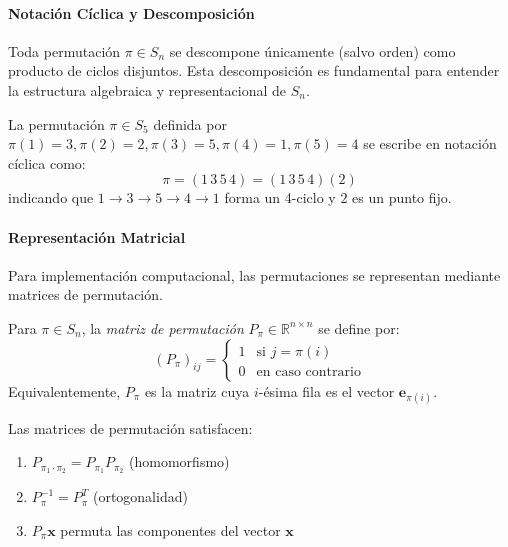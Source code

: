 \paragraph{Notación Cíclica y Descomposición}

Toda permutación $\pi \in S_n$ se descompone únicamente (salvo orden) como producto de ciclos disjuntos. Esta descomposición es fundamental para entender la estructura algebraica y representacional de $S_n$.

\begin{example}
La permutación $\pi \in S_5$ definida por $\pi(1)=3, \pi(2)=2, \pi(3)=5, \pi(4)=1, \pi(5)=4$ se escribe en notación cíclica como:
\begin{equation}
\pi = (1\,3\,5\,4) = (1\,3\,5\,4)(2)
\end{equation}
indicando que $1 \to 3 \to 5 \to 4 \to 1$ forma un 4-ciclo y $2$ es un punto fijo.
\end{example}

\paragraph{Representación Matricial}

Para implementación computacional, las permutaciones se representan mediante matrices de permutación.

\begin{definition}\label{def:permutation_matrix}
Para $\pi \in S_n$, la \textit{matriz de permutación} $P_\pi \in \mathbb{R}^{n \times n}$ se define por:
\begin{equation}
(P_\pi)_{ij} = \begin{cases}
1 & \text{si } j = \pi(i) \\
0 & \text{en caso contrario}
\end{cases}
\end{equation}
Equivalentemente, $P_\pi$ es la matriz cuya $i$-ésima fila es el vector $\mathbf{e}_{\pi(i)}$.
\end{definition}

\begin{proposition}\label{prop:permutation_matrix_properties}
Las matrices de permutación satisfacen:
\begin{enumerate}
    \item $P_{\pi_1 \cdot \pi_2} = P_{\pi_1} P_{\pi_2}$ (homomorfismo)
    \item $P_\pi^{-1} = P_\pi^T$ (ortogonalidad)
    \item $P_\pi \mathbf{x}$ permuta las componentes del vector $\mathbf{x}$
\end{enumerate}
\end{proposition}

